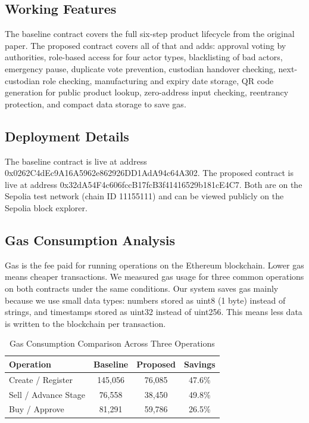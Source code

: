 \documentclass[conference]{IEEEtran}
\begin{document}
\subsection{Working Features}

The baseline contract covers the full six-step product lifecycle from the original paper. The proposed contract covers all of that and adds: approval voting by authorities, role-based access for four actor types, blacklisting of bad actors, emergency pause, duplicate vote prevention, custodian handover checking, next-custodian role checking, manufacturing and expiry date storage, QR code generation for public product lookup, zero-address input checking, reentrancy protection, and compact data storage to save gas.

\subsection{Deployment Details}

The baseline contract is live at address 0x0262C4dEc9A16A5962e862926DD1AdA94c64A302. The proposed contract is live at address 0x32dA54F4c606fccB17fcB3f41416529b181cE4C7. Both are on the Sepolia test network (chain ID 11155111) and can be viewed publicly on the Sepolia block explorer.

\subsection{Gas Consumption Analysis}

Gas is the fee paid for running operations on the Ethereum blockchain. Lower gas means cheaper transactions. We measured gas usage for three common operations on both contracts under the same conditions. Our system saves gas mainly because we use small data types: numbers stored as uint8 (1 byte) instead of strings, and timestamps stored as uint32 instead of uint256. This means less data is written to the blockchain per transaction.

\begin{table}[htbp]
\caption{Gas Consumption Comparison Across Three Operations}
\label{tab:gas}
\begin{center}
\renewcommand{\arraystretch}{1.2}
\begin{tabular}{|>{\raggedright\arraybackslash}p{2.6cm}|c|c|c|}
\hline
\textbf{Operation} & \textbf{Baseline} & \textbf{Proposed} & \textbf{Savings} \\
\hline
Create / Register & 145,056 & 76,085 & 47.6\% \\
\hline
Sell / Advance Stage & 76,558 & 38,450 & 49.8\% \\
\hline
Buy / Approve & 81,291 & 59,786 & 26.5\% \\
\hline
\end{tabular}
\end{center}
\end{table}
\end{document}
